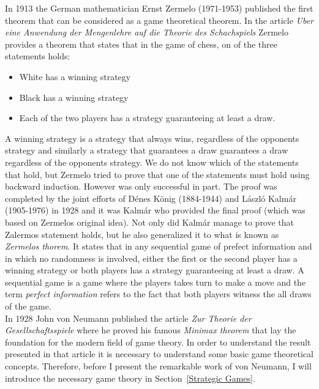 \documentclass{article}
\theoremstyle{definition}
\theoremstyle{remark}
\begin{document}
In 1913 the German mathematician Ernst Zermelo (1971-1953) published
the first theorem that can be considered as a game theoretical
theorem. In the article \emph{Uber eine Anwendung der Mengenlehre auf die
  Theorie des Schachspiels} Zermelo provides a theorem that states
that in the game of chess, on of the three statements holds:
\begin{itemize}
\item White has a winning strategy
\item Black has a winning strategy
  \item Each of the two players has a strategy guaranteeing at least a
    draw. \citep{Schwalbe2001}
  \end{itemize}
  A winning strategy is a strategy that always wins, regardless of the
  opponents strategy and similarly a strategy that guarantees a draw
  guarantees a draw regardless of the opponents strategy. We do not
  know which of the statements that hold, but Zermelo tried to prove
  that one of the statements must hold using backward
  induction. However was only successful in part. The proof was
  completed by the joint efforts of Dénes König (1884-1944) and László
  Kalmár (1905-1976) in 1928 and it was Kalmár who provided the final proof
  (which was based on Zermelos original idea). Not only did Kalmár manage
  to prove that Zalermos statement holds, but he also generalized it to
  what is known as \emph{Zermelos thorem}. It states that in any
  sequential game of prefect information and in which no randomness is
  involved, either the first or the second player has a winning
  strategy or both players has a strategy guaranteeing at least a
    draw. \citep{Schwalbe2001} A sequential game is a game where the players takes turn to
    make a move and the term \emph{perfect information} refers to the
    fact that both players witness the all draws of the game.\\

    In 1928 John von Neumann published the article \emph{Zur
      Theorie der Gesellschaftsspiele} where he proved his famous
    \emph{Minimax theorem} that lay the foundation for the modern
    field of game theory. In order to understand the result presented
    in that article it is necessary to understand some basic game
    theoretical concepts. Therefore, before I present the remarkable
    work of von Neumann, I will introduce the necessary game theory in
    Section~\ref{Strategic Games}. 
  
\end{document}

